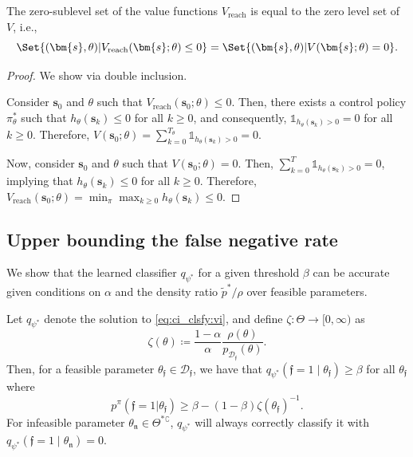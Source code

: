 \documentclass{article} %
\def\vb{{\bm{b}}}
\def\vx{{\bm{x}}}
\newcommand{\feas}{\mathfrak{f}}
\newcommand{\infeas}{\mathfrak{n}}
\newcommand{\CISet}{\Theta^*}
\newcommand{\MeasuredCISet}{\mathcal{D}_{\feas{}}}
\newcommand{\ind}{\mathbb{1}}
\def\vx{{\vb{x}}}
\def\vx{{\bm{s}}}
\begin{document}
\begin{lemma}
\label{lem:reach_avoid_equivalence}
    The zero-sublevel set of the value functions $V_{\text{reach}}$ is equal to the zero level set of $V$, i.e.,
    \begin{equation}
        \Set{ (\vx, \theta) | V_{\text{reach}}(\vx; \theta) \leq 0 } = \Set{ (\vx, \theta) | V(\vx; \theta) = 0 }.
    \end{equation}
\end{lemma}

\begin{proof}
    We show via double inclusion.

    
    Consider $\vx_0$ and $\theta$ such that $V_{\text{reach}}(\vx_0; \theta) \leq 0$.
    Then, there exists a control policy $\pi_\theta^\ast$ such that $h_\theta(\vx_k) \leq 0$ for all $k \geq 0$, and consequently, $\ind_{h_\theta(\vx_k) > 0} = 0$ for all $k \geq 0$.
    Therefore, $V(\vx_0; \theta) = \sum_{k=0}^{T_\theta} \ind_{h_\theta(\vx_k) > 0} = 0$.

    Now, consider $\vx_0$ and $\theta$ such that $V(\vx_0; \theta) = 0$.
    Then, $\sum_{k=0}^T \ind_{h_\theta(\vx_k) > 0} = 0$, implying that $h_\theta(\vx_k) \leq 0$ for all $k \geq 0$.
    Therefore, $V_{\text{reach}}(\vx_0; \theta) = \min_\pi \max_{k \geq 0} h_\theta(\vx_k) \leq 0$.
\end{proof}

{
\subsection{Upper bounding the false negative rate} \label{app:proof:ci_clsfy_probs}

We show that the learned classifier $q_{\psi^*}$ for a given threshold $\beta$ can be accurate given conditions on $\alpha$ and the density ratio $\tilde{p}^* / \rho$ over feasible parameters.
\begin{thm} \label{thm:ci_clsfy_probs}
    Let $q_{\psi^*}$ denote the solution to \eqref{eq:ci_clsfy:vi}, and define $\zeta : \Theta \to [0, \infty)$ as
    \begin{equation}
        \zeta(\theta) \coloneqq \frac{1 - \alpha}{\alpha} \frac{ \rho(\theta) }{ p_{\MeasuredCISet}(\theta) }.
    \end{equation}
    Then, for a feasible parameter $\theta_\feas{} \in \MeasuredCISet$, we have that $q_{\psi^*}( \feas{} = 1 \mid \theta_\feas{} ) \geq \beta$ for all $\theta_\feas{}$ where
    \begin{equation}
        p^\pi(\feas{} = 1 | \theta_\feas{}) \geq \beta - (1-\beta) \zeta(\theta_\feas{})^{-1}.
    \end{equation}
    For infeasible parameter $\theta_{\infeas{}} \in \CISet{}^\complement$, $q_{\psi^*}$ will always correctly classify it with $q_{\psi^*}(\feas{} = 1 \mid \theta_{\infeas{}}) = 0$.
\end{thm}
}
\end{document}
